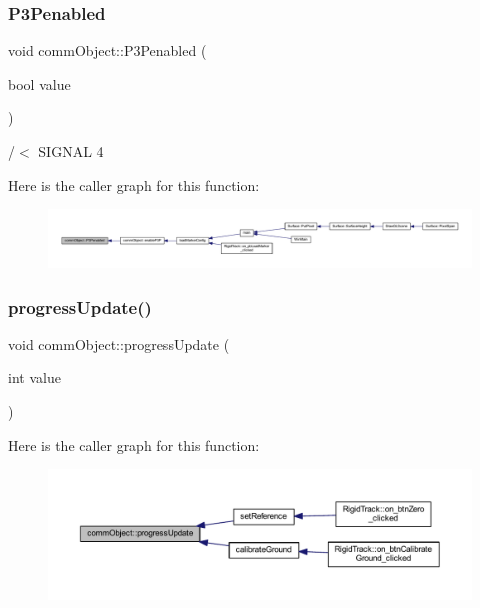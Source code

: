 \subsubsection{\texorpdfstring{P3\+Penabled}{P3Penabled}}
{\footnotesize\ttfamily void comm\+Object\+::\+P3\+Penabled (\begin{DoxyParamCaption}\item[{bool}]{value }\end{DoxyParamCaption})\hspace{0.3cm}{\ttfamily [signal]}}



/$<$ S\+I\+G\+N\+AL 4 

Here is the caller graph for this function\+:
\nopagebreak
\begin{figure}[H]
\begin{center}
\leavevmode
\includegraphics[width=350pt]{classcomm_object_af369de87a7f2c9b7170223bedd6c08d9_icgraph}
\end{center}
\end{figure}
\mbox{\label{classcomm_object_acfc97f4310e2b7d841ecb8cf8be0088e}} 
\subsubsection{\texorpdfstring{progress\+Update()}{progressUpdate()}}
{\footnotesize\ttfamily void comm\+Object\+::progress\+Update (\begin{DoxyParamCaption}\item[{int}]{value }\end{DoxyParamCaption})}

Here is the caller graph for this function\+:
\nopagebreak
\begin{figure}[H]
\begin{center}
\leavevmode
\includegraphics[width=350pt]{classcomm_object_acfc97f4310e2b7d841ecb8cf8be0088e_icgraph}
\end{center}
\end{figure}
\mbox{\label{classcomm_object_a6039d306f25a6b46c78942edf9cee662}} 
